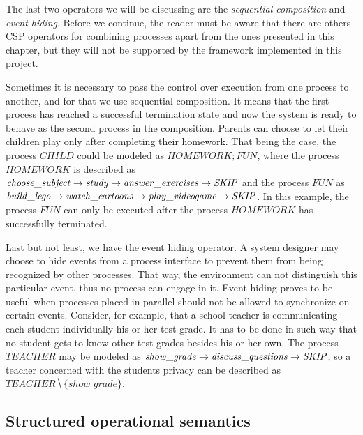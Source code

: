 The last two operators we will be discussing are the \emph{sequential composition} and \emph{event hiding}. Before we continue, the reader must be aware that there are others CSP operators for combining processes apart from the ones presented in this chapter, but they will not be supported by the framework implemented in this project.

Sometimes it is necessary to pass the control over execution from one process to another, and for that we use sequential composition. It means that the first process has reached a successful termination state and now the system is ready to behave as the second process in the composition. Parents can choose to let their children play only after completing their homework. That being the case, the process $ \mathit{CHILD} $ could be modeled as $ \mathit{HOMEWORK}\!; \mathit{FUN} $, where the process $ \mathit{HOMEWORK} $ is described as $ \mathit{choose\_subject} \mathrel{\rightarrow} \mathit{study} \mathrel{\rightarrow} \mathit{answer\_exercises} \mathrel{\rightarrow} \mathit{\mathord{{SKIP}}} $ and the process $ \mathit{FUN} $ as $ \mathit{build\_lego} \mathrel{\rightarrow} \mathit{watch\_cartoons} \mathrel{\rightarrow} \mathit{play\_videogame} \mathrel{\rightarrow} \mathit{\mathord{{SKIP}}} $. In this example, the process $ \mathit{FUN} $ can only be executed after the process $ \mathit{HOMEWORK} $ has successfully terminated.

Last but not least, we have the event hiding operator. A system designer may choose to hide events from a process interface to prevent them from being recognized by other processes. That way, the environment can not distinguish this particular event, thus no process can engage in it. Event hiding proves to be useful when processes placed in parallel should not be allowed to synchronize on certain events. Consider, for example, that a school teacher is communicating each student individually his or her test grade. It has to be done in such way that no student gets to know other test grades besides his or her own. The process $ \mathit{TEACHER} $ may be modeled as $ \mathit{show\_grade} \mathrel{\rightarrow} \mathit{discuss\_questions} \mathrel{\rightarrow} \mathit{\mathord{{SKIP}}} $, so a teacher concerned with the students privacy can be described as $ \mathit{TEACHER} \hide \{show\_grade\} $.

\subsection{Structured operational semantics}


